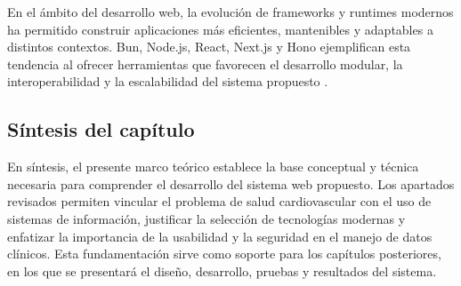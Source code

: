 En el ámbito del desarrollo web, la evolución de frameworks y runtimes modernos ha permitido construir aplicaciones más eficientes, mantenibles y adaptables a distintos contextos. Bun, Node.js, React, Next.js y Hono ejemplifican esta tendencia al ofrecer herramientas que favorecen el desarrollo modular, la interoperabilidad y la escalabilidad del sistema propuesto \cite{bun2025docs,nodejs2025docs,react2025docs,nextjs2025docs,hono2025docs}.

\subsection{Síntesis del capítulo}

En síntesis, el presente marco teórico establece la base conceptual y técnica necesaria para comprender el desarrollo del sistema web propuesto. Los apartados revisados permiten vincular el problema de salud cardiovascular con el uso de sistemas de información, justificar la selección de tecnologías modernas y enfatizar la importancia de la usabilidad y la seguridad en el manejo de datos clínicos. Esta fundamentación sirve como soporte para los capítulos posteriores, en los que se presentará el diseño, desarrollo, pruebas y resultados del sistema.
